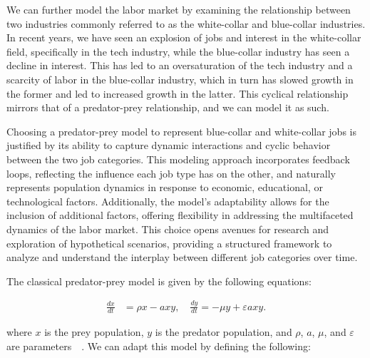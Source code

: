 \documentclass[11pt]{amsart}
\begin{document}
We can further model the labor market by examining the relationship between two industries commonly referred to as the white-collar and blue-collar industries.
In recent years, we have seen an explosion of jobs and interest in the white-collar field, specifically in the tech industry, while the blue-collar industry has seen a decline in interest.
This has led to an oversaturation of the tech industry and a scarcity of labor in the blue-collar industry, which in turn has slowed growth in the former and led to increased growth in the latter.
This cyclical relationship mirrors that of a predator-prey relationship, and we can model it as such. 

Choosing a predator-prey model to represent blue-collar and white-collar jobs is justified by its ability to capture dynamic interactions and 
cyclic behavior between the two job categories. This modeling approach incorporates feedback loops, reflecting the influence each job type has 
on the other, and naturally represents population dynamics in response to economic, educational, or technological factors. 
Additionally, the model's adaptability allows for the inclusion of additional factors, offering flexibility in addressing 
the multifaceted dynamics of the labor market. This choice opens avenues for research and exploration of hypothetical scenarios, 
providing a structured framework to analyze and understand the interplay between different job categories over time.

The classical predator-prey model is given by the following equations:


\begin{align}
    \frac{dx}{dt} &= \rho x - a x y, \quad \frac{dy}{dt} = -\mu y + \varepsilon a x y.
\end{align}

where $x$ is the prey population, $y$ is the predator population, and $\rho$, $a$, $\mu$, and $\varepsilon$ are parameters~\cite{lotka1925elements}~\cite{volterra1926fluctuations}. 
We can adapt this model by defining the following:

\end{document}
